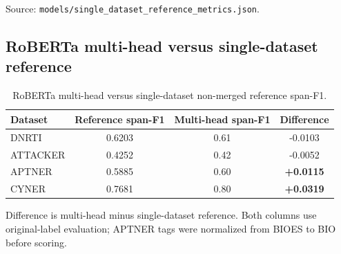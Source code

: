 \begin{table}[h!]
\centering
{}%
\caption{Single-dataset RoBERTa reference results using original labels without label merging.}
\label{tab:single_dataset_roberta_reference}
\end{table}

Source: \texttt{models/single\_dataset\_reference\_metrics.json}.

\subsection*{RoBERTa multi-head versus single-dataset reference}

\begin{table}[h!]
\centering
\begin{tabular}{lccc}
\toprule
\textbf{Dataset} & \textbf{Reference span-F1} & \textbf{Multi-head span-F1} & \textbf{Difference} \\
\midrule
DNRTI    & 0.6203 & 0.61 & -0.0103 \\
ATTACKER & 0.4252 & 0.42 & -0.0052 \\
APTNER   & 0.5885 & 0.60 & \textbf{+0.0115} \\
CYNER    & 0.7681 & 0.80 & \textbf{+0.0319} \\
\bottomrule
\end{tabular}
\caption{RoBERTa multi-head versus single-dataset non-merged reference span-F1.}
\label{tab:roberta_multihead_vs_reference}
\end{table}

Difference is multi-head minus single-dataset reference. Both columns use original-label
evaluation; APTNER tags were normalized from BIOES to BIO before scoring.
